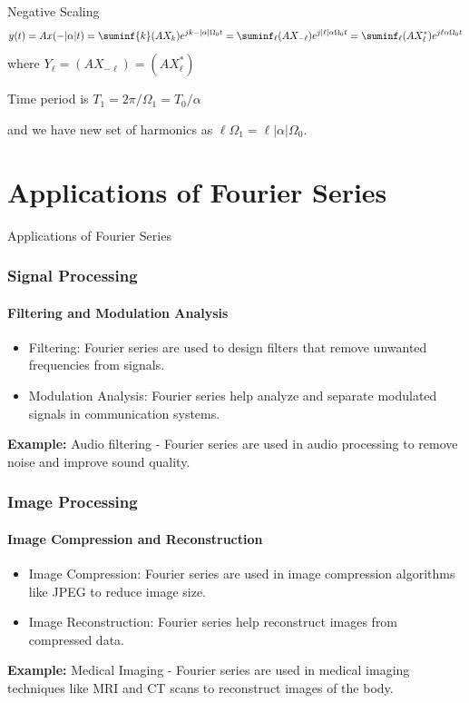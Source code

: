\documentclass[aspectratio=169,xcolor=dvipsnames,svgnames,x11names,fleqn]{beamer}
\begin{document}
\begin{frame}{Negative Scaling}
    $$
    y(t) = Ax(-|\alpha| t) = \suminf{k} (AX_k)  e^{jk -|\alpha| \Omega_0  t}= \suminf_{\ell} (AX_{-\ell})  e^{j |\ell|\alpha \Omega_0  t} = \suminf_{\ell} (AX^*_{\ell})  e^{j \ell\alpha \Omega_0  t}
    $$
    where $Y_\ell  =  (AX_{-\ell}) = (AX^*_{\ell})$

    Time period is  $T_1 = 2\pi /\Omega_1 = T_0 /\alpha$

    and we have new set of harmonics as $\ell \Omega_1 = \ell |\alpha| \Omega_0$.
\end{frame}

\section{Applications of Fourier Series}


\begin{frame}{}
    \begin{center}
    \Huge \bf \color{DarkBlue}
    \faTags
    
Applications of Fourier Series

\end{center}
\end{frame}


\begin{frame}
  \frametitle{Signal Processing}
  \framesubtitle{Filtering and Modulation Analysis}
  \begin{itemize}
    \item Filtering: Fourier series are used to design filters that remove unwanted frequencies from signals.
    \item Modulation Analysis: Fourier series help analyze and separate modulated signals in communication systems.
  \end{itemize}
  \vspace{1cm}
  \textbf{Example:} Audio filtering - Fourier series are used in audio processing to remove noise and improve sound quality.
\end{frame}

\begin{frame}
  \frametitle{Image Processing}
  \framesubtitle{Image Compression and Reconstruction}
  \begin{itemize}
    \item Image Compression: Fourier series are used in image compression algorithms like JPEG to reduce image size.
    \item Image Reconstruction: Fourier series help reconstruct images from compressed data.
  \end{itemize}
  \vspace{1cm}
  \textbf{Example:} Medical Imaging - Fourier series are used in medical imaging techniques like MRI and CT scans to reconstruct images of the body.
\end{frame}
\end{document}
